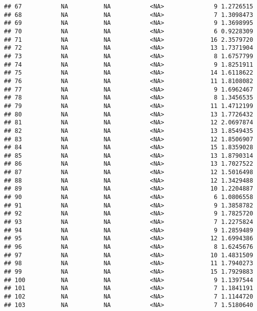 \documentclass[]{article}
\begin{document}
\begin{verbatim}
## 67           NA          NA           <NA>              9 1.2726515
## 68           NA          NA           <NA>              7 1.3098473
## 69           NA          NA           <NA>              9 1.3698995
## 70           NA          NA           <NA>              6 0.9228309
## 71           NA          NA           <NA>             16 2.3579720
## 72           NA          NA           <NA>             13 1.7371904
## 73           NA          NA           <NA>              8 1.6757799
## 74           NA          NA           <NA>              9 1.8251911
## 75           NA          NA           <NA>             14 1.6118622
## 76           NA          NA           <NA>             11 1.8108082
## 77           NA          NA           <NA>              9 1.6962467
## 78           NA          NA           <NA>              8 1.3456535
## 79           NA          NA           <NA>             11 1.4712199
## 80           NA          NA           <NA>             13 1.7726432
## 81           NA          NA           <NA>             12 2.0697874
## 82           NA          NA           <NA>             13 1.8549435
## 83           NA          NA           <NA>             12 1.8506907
## 84           NA          NA           <NA>             15 1.8359028
## 85           NA          NA           <NA>             13 1.8790314
## 86           NA          NA           <NA>             13 1.7027522
## 87           NA          NA           <NA>             12 1.5016498
## 88           NA          NA           <NA>             12 1.3429488
## 89           NA          NA           <NA>             10 1.2204887
## 90           NA          NA           <NA>              6 1.0806558
## 91           NA          NA           <NA>              9 1.3858782
## 92           NA          NA           <NA>              9 1.7825720
## 93           NA          NA           <NA>              7 1.2275824
## 94           NA          NA           <NA>              9 1.2859489
## 95           NA          NA           <NA>             12 1.6994386
## 96           NA          NA           <NA>              8 1.6245676
## 97           NA          NA           <NA>             10 1.4831509
## 98           NA          NA           <NA>             11 1.7940273
## 99           NA          NA           <NA>             15 1.7929883
## 100          NA          NA           <NA>              9 1.1397544
## 101          NA          NA           <NA>              7 1.1841191
## 102          NA          NA           <NA>              7 1.1144720
## 103          NA          NA           <NA>              7 1.5180640

\end{verbatim}
\end{document}
